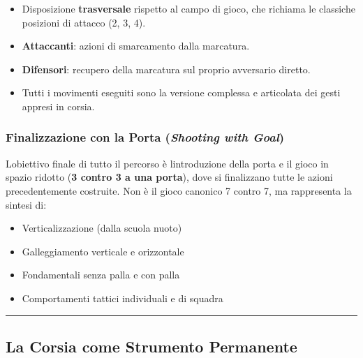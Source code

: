 \documentclass[a4paper,11pt]{article}
\providecommand{\tightlist}{%
  \setlength{\itemsep}{0pt}\setlength{\parskip}{0pt}}
\begin{document}
\begin{itemize}
      \tightlist
      \item
            Disposizione \textbf{trasversale} rispetto al campo di gioco, che
            richiama le classiche posizioni di attacco (2, 3, 4).
      \item
            \textbf{Attaccanti}: azioni di smarcamento dalla marcatura.
      \item
            \textbf{Difensori}: recupero della marcatura sul proprio avversario
            diretto.
      \item
            Tutti i movimenti eseguiti sono la versione complessa e articolata dei
            gesti appresi in corsia.
\end{itemize}

\subsubsection{\texorpdfstring{Finalizzazione con la Porta
            (\emph{Shooting with
                  Goal})}{Finalizzazione con la Porta (Shooting with Goal)}}\label{finalizzazione-con-la-porta-shooting-with-goal}

L\textquotesingle obiettivo finale di tutto il percorso è
l\textquotesingle introduzione della porta e il gioco in spazio ridotto
(\textbf{3 contro 3 a una porta}), dove si finalizzano tutte le azioni
precedentemente costruite. Non è il gioco canonico 7 contro 7, ma
rappresenta la sintesi di:

\begin{itemize}
      \tightlist
      \item
            Verticalizzazione (dalla scuola nuoto)
      \item
            Galleggiamento verticale e orizzontale
      \item
            Fondamentali senza palla e con palla
      \item
            Comportamenti tattici individuali e di squadra
\end{itemize}

\begin{center}\rule{0.5\linewidth}{0.5pt}\end{center}

\subsection{La Corsia come Strumento
      Permanente}\label{la-corsia-come-strumento-permanente}
\end{document}
